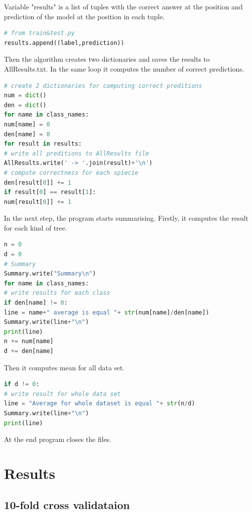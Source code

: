 \documentclass[12pt]{article}
\begin{document}
Variable "results" is a list of tuples with the correct answer at the  position and prediction of the model at the  position in each tuple.

\begin{lstlisting}[language=Python]
# from train&test.py
results.append((label,prediction))
\end{lstlisting}

Then the algorithm creates two dictionaries and saves the results to AllResults.txt. In the same loop it computes the number of correct predictions.

\begin{lstlisting}[language=Python]
# create 2 dictionaries for computing correct preditions
num = dict()
den = dict()
for name in class_names:
num[name] = 0
den[name] = 0
for result in results:
# write all preditions to AllResults file
AllResults.write(' -> '.join(result)+'\n')
# compute correctness for each spiecie
den[result[0]] += 1
if result[0] == result[1]:
num[result[0]] += 1
\end{lstlisting}

In the next step, the program starts summarising. Firstly, it computes the result for each kind of tree.

\begin{lstlisting}[language=Python]
n = 0
d = 0
# Summary
Summary.write("Summary\n")
for name in class_names:
# write results for each class
if den[name] != 0:
line = name+" average is equal "+ str(num[name]/den[name])
Summary.write(line+"\n")
print(line)
n += num[name]
d += den[name]
\end{lstlisting}

Then it computes mean for all data set.

\begin{lstlisting}[language=Python]
if d != 0:
# write result for whole data set
line = "Average for whole dataset is equal "+ str(n/d)
Summary.write(line+"\n")
print(line)
\end{lstlisting}

At the end program closes the files.

\newpage

\section{Results}

\subsection{10-fold cross validataion}
\end{document}
